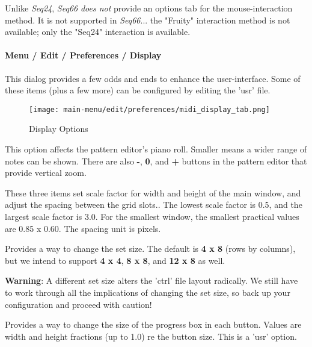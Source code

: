   Unlike \textsl{Seq24}, \textsl{Seq66}
   \textsl{does not} provide an options tab for
   the mouse-interaction method.
   It is not supported in \textsl{Seq66}...
   the "Fruity" interaction method is not available;
   only the "Seq24" interaction is available.
 
\paragraph{Menu / Edit / Preferences / Display}
\label{paragraph:menu_edit_preferences_display}

   This dialog provides a few odds and ends to enhance the user-interface.
   Some of these items (plus a few more) can be configured by editing the 'usr'
   file.

\begin{figure}[H]
   \centering 
   \texttt{[image: main-menu/edit/preferences/midi\_display\_tab.png]}
   \caption{Display Options}
   \label{fig:midi_display_tab}
\end{figure}

   \setcounter{ItemCounter}{0}      %

   This option affects the pattern editor's piano roll.  Smaller means a wider
   range of notes can be shown.  There are also
   \textbf{-},
   \textbf{0}, and
   \textbf{+} buttons in the pattern editor that provide
   vertical zoom.

   These three items set scale factor for width and height of the main window,
   and adjust the spacing between the grid slots..
   The lowest scale factor is 0.5, and the largest scale factor is 3.0.
   For the smallest window, the smallest practical values are 0.85 x 0.60.
   The spacing unit is pixels.

   Provides a way to change the set size.  The default is
   \textbf{4 x 8}
   (rows by columns), but we intend to support
   \textbf{4 x 4},
   \textbf{8 x 8}, and
   \textbf{12 x 8}
   as well.

   \textbf{Warning}:
   A different set size alters the 'ctrl' file layout radically.
   We still have to work through all the implications of changing the set size,
   so back up your configuration and proceed with caution!

   Provides a way to change the size of the progress box in each button.
   Values are width and height fractions (up to 1.0) re the button size.
   This is a 'usr' option.

